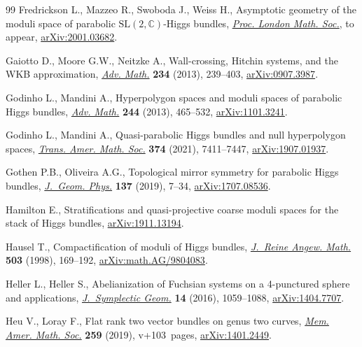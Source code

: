 \documentclass[10pt,a4paper]{amsart}
\numberwithin{equation}{section}
\begin{document}
\begin{thebibliography}{99}
Fredrickson L., Mazzeo R., Swoboda J., Weiss H., Asymptotic geometry of the
 moduli space of parabolic $\mathrm{SL}(2,\mathbb{C})$-{H}iggs bundles,
 \href{https://doi.org/10.1112/jlms.12581}{\textit{Proc. London Math. Soc.}}, {t}o appear, \href{https://arxiv.org/abs/2001.03682}{arXiv:2001.03682}.

Gaiotto D., Moore G.W., Neitzke A., Wall-crossing, {H}itchin systems, and the
 {WKB} approximation, \href{https://doi.org/10.1016/j.aim.2012.09.027}{\textit{Adv. Math.}} \textbf{234} (2013), 239--403,
 \href{https://arxiv.org/abs/0907.3987}{arXiv:0907.3987}.

Godinho L., Mandini A., Hyperpolygon spaces and moduli spaces of parabolic
 {H}iggs bundles, \href{https://doi.org/10.1016/j.aim.2013.04.026}{\textit{Adv. Math.}} \textbf{244} (2013), 465--532,
 \href{https://arxiv.org/abs/1101.3241}{arXiv:1101.3241}.

Godinho L., Mandini A., Quasi-parabolic {H}iggs bundles and null hyperpolygon
 spaces, \href{https://doi.org/10.1090/tran/8450}{\textit{Trans. Amer. Math. Soc.}} \textbf{374} (2021), 7411--7447,
 \href{https://arxiv.org/abs/1907.01937}{arXiv:1907.01937}.

Gothen P.B., Oliveira A.G., Topological mirror symmetry for parabolic {H}iggs
 bundles, \href{https://doi.org/10.1016/j.geomphys.2018.08.020}{\textit{J.~Geom. Phys.}} \textbf{137} (2019), 7--34,
 \href{https://arxiv.org/abs/1707.08536}{arXiv:1707.08536}.

Hamilton E., Stratifications and quasi-projective coarse moduli spaces for the
 stack of {H}iggs bundles, \href{https://arxiv.org/abs/1911.13194}{arXiv:1911.13194}.

Hausel T., Compactification of moduli of {H}iggs bundles, \href{https://doi.org/10.1515/crll.1998.096}{\textit{J.~Reine
 Angew. Math.}} \textbf{503} (1998), 169--192, \href{https://arxiv.org/abs/math.AG/9804083}{arXiv:math.AG/9804083}.

Heller L., Heller S., Abelianization of {F}uchsian systems on a 4-punctured
 sphere and applications, \href{https://doi.org/10.4310/JSG.2016.v14.n4.a4}{\textit{J.~Symplectic Geom.}} \textbf{14} (2016),
 1059--1088, \href{https://arxiv.org/abs/1404.7707}{arXiv:1404.7707}.

Heu V., Loray F., Flat rank two vector bundles on genus two curves,
 \href{https://doi.org/10.1090/memo/1247}{\textit{Mem. Amer. Math. Soc.}} \textbf{259} (2019), v+103~pages,
 \href{https://arxiv.org/abs/1401.2449}{arXiv:1401.2449}.


\end{thebibliography}
\end{document}
